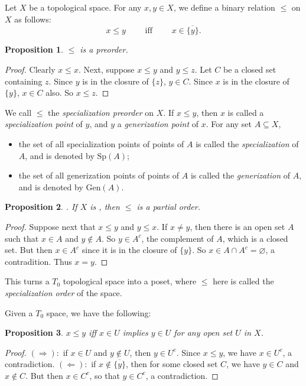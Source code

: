 \documentclass[12pt]{article}
\newtheorem{prop}{Proposition}
\begin{document}
Let $X$ be a topological space.  For any $x,y\in X$, we define a binary relation $\le$ on $X$ as follows: $$x\le y \qquad \mbox{ iff } \qquad x \in \overline{\lbrace y\rbrace}.$$

\begin{prop}  $\le$ is a preorder. \end{prop}
\begin{proof}
Clearly $x\le x$.  Next, suppose $x\le y$ and $y\le z$.  Let $C$ be a closed set containing $z$.  Since $y$ is in the closure of $\lbrace z\rbrace$, $y\in C$.  Since $x$ is in the closure of $\lbrace y\rbrace$, $x\in C$ also.  So $x\le z$.  \end{proof}

We call $\le$ the \emph{specialization preorder} on $X$.  If $x\le y$, then $x$ is called a \emph{specialization point} of $y$, and $y$ a \emph{generization point} of $x$.  For any set $A\subseteq X$, 
\begin{itemize}
\item
the set of all specialization points of points of $A$ is called the \emph{specialization} of $A$, and is denoted by $\mathrm{Sp}(A)$; 
\item
the set of all generization points of points of $A$ is called the \emph{generization} of $A$, and is denoted by $\mathrm{Gen}(A)$.
\end{itemize}

\begin{prop}.  If $X$ is , then $\le$ is a partial order. \end{prop}
\begin{proof}
Suppose next that $x\le y$ and $y\le x$.  If $x\ne y$, then there is an open set $A$ such that $x\in A$ and $y\notin A$.  So $y\in A^c$, the complement of $A$, which is a closed set.  But then $x\in A^c$ since it is in the closure of $\lbrace y\rbrace$.  So $x\in A\cap A^c=\varnothing$, a contradition.  Thus $x=y$.  \end{proof}

This turns a $T_0$ topological space into a poset, where $\le$ here is called the \emph{specialization order} of the space.  

Given a $T_0$ space, we have the following: 
\begin{prop} $x\le y$ iff $x\in U$ implies $y\in U$ for any open set $U$ in $X$. \end{prop}  
\begin{proof} $(\Rightarrow):$  if $x\in U$ and $y\notin U$, then $y\in U^c$.  Since $x\le y$, we have $x\in U^c$, a contradiction. $(\Leftarrow) :$ if $x\notin \overline{\lbrace y\rbrace}$, then for some closed set $C$, we have $y\in C$ and $x\notin C$.  But then $x\in C^c$, so that $y\in C^c$, a contradiction.  \end{proof}
\end{document}
